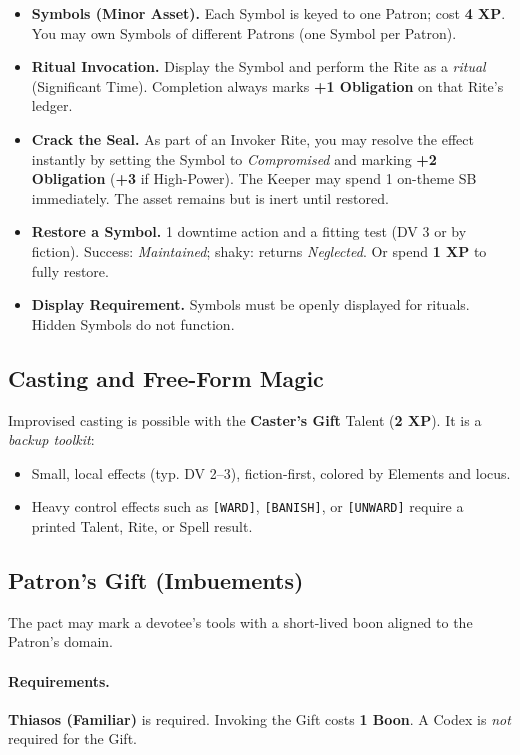 \begin{itemize}
  \item \textbf{Symbols (Minor Asset).} Each Symbol is keyed to one Patron; cost \textbf{4 XP}. You may own Symbols of different Patrons (one Symbol per Patron).
  \item \textbf{Ritual Invocation.} Display the Symbol and perform the Rite as a \emph{ritual} (Significant Time). Completion always marks \textbf{+1 Obligation} on that Rite's ledger.
  \item \textbf{Crack the Seal.} As part of an Invoker Rite, you may resolve the effect instantly by setting the Symbol to \emph{Compromised} and marking \textbf{+2 Obligation} (\textbf{+3} if High-Power). The Keeper may spend 1 on-theme SB immediately. The asset remains but is inert until restored.
  \item \textbf{Restore a Symbol.} 1 downtime action and a fitting test (DV 3 or by fiction). Success: \emph{Maintained}; shaky: returns \emph{Neglected}. Or spend \textbf{1 XP} to fully restore.
  \item \textbf{Display Requirement.} Symbols must be openly displayed for rituals. Hidden Symbols do not function.
\end{itemize}

\subsection{Casting and Free-Form Magic}
\label{subsec:casting}
Improvised casting is possible with the \textbf{Caster's Gift} Talent (\textbf{2 XP}). It is a \emph{backup toolkit}:
\begin{itemize}
  \item Small, local effects (typ. DV 2--3), fiction-first, colored by Elements and locus.
  \item Heavy control effects such as \texttt{[WARD]}, \texttt{[BANISH]}, or \texttt{[UNWARD]} require a printed Talent, Rite, or Spell result.
\end{itemize}

\subsection{Patron's Gift (Imbuements)}
\label{subsec:patrons-gift}
The pact may mark a devotee's tools with a short-lived boon aligned to the Patron's domain.

\paragraph{Requirements.}
\textbf{Thiasos (Familiar)} is required. Invoking the Gift costs \textbf{1 Boon}. A Codex is \emph{not} required for the Gift.

